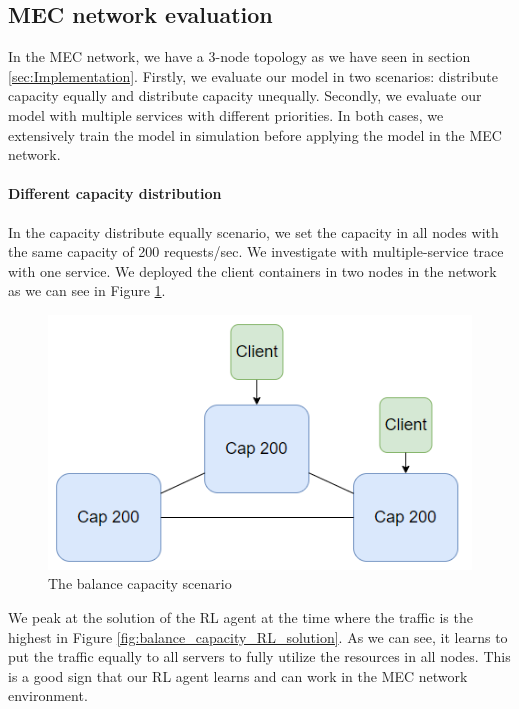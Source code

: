 \documentclass[conference]{IEEEtran}
\begin{document}
\subsection{MEC network evaluation}
In the MEC network, we have a 3-node topology as we have seen in section \ref{sec:Implementation}. Firstly, we evaluate our model in two scenarios: distribute capacity equally and distribute capacity unequally. Secondly, we evaluate our model with multiple services with different priorities. In both cases, we extensively train the model in simulation before applying the model in the MEC network. 

\paragraph{Different capacity distribution}

In the capacity distribute equally scenario, we set the capacity in all nodes with the same capacity of 200 requests/sec. We investigate with multiple-service trace with one service. We deployed the client containers in two nodes in the network as we can see in Figure \ref{fig:balance_capacity_scenario}.

\begin{figure}[]
    \centering
    \includegraphics[scale = 0.5]{imgs/balance_capacity_scenario.png}
    \caption{The balance capacity scenario}
    \label{fig:balance_capacity_scenario}
\end{figure}

We peak at the solution of the RL agent at the time where the traffic is the highest in Figure \ref{fig:balance_capacity_RL_solution}. As we can see, it learns to put the traffic equally to all servers to fully utilize the resources in all nodes. This is a good sign that our RL agent learns and can work in the MEC network environment. 
\end{document}

